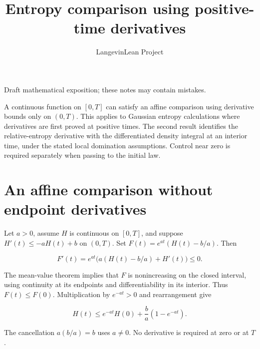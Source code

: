 \documentclass[11pt,a4paper]{article}
\title{\texorpdfstring{Entropy comparison using positive-time derivatives}{Entropy comparison using positive-time derivatives}}
\author{LangevinLean Project}
\date{}
\begin{document}
\maketitle
Draft mathematical exposition; these notes may contain mistakes.


A continuous function on \([0,T]\) can satisfy an affine comparison using derivative bounds only on \((0,T)\). This applies to Gaussian entropy calculations where derivatives are first proved at positive times. The second result identifies the relative-entropy derivative with the differentiated density integral at an interior time, under the stated local domination assumptions. Control near zero is required separately when passing to the initial law.


\section{\texorpdfstring{An affine comparison without endpoint derivatives}{An affine comparison without endpoint derivatives}}


Let \(a>0\), assume \(H\) is continuous on \([0,T]\), and suppose \(H'(t)\le-aH(t)+b\) on \((0,T)\). Set \(F(t)=e^{at}(H(t)-b/a)\). Then

\[F'(t)=e^{at}\bigl(a(H(t)-b/a)+H'(t)\bigr)\le0.\]

The mean-value theorem implies that \(F\) is nonincreasing on the closed interval, using continuity at its endpoints and differentiability in its interior. Thus \(F(t)\le F(0)\). Multiplication by \(e^{-at}>0\) and rearrangement give

\[H(t)\le e^{-at}H(0)+\frac ba(1-e^{-at}).\]

The cancellation \(a(b/a)=b\) uses \(a\ne0\). No derivative is required at zero or at \(T\).
\end{document}
